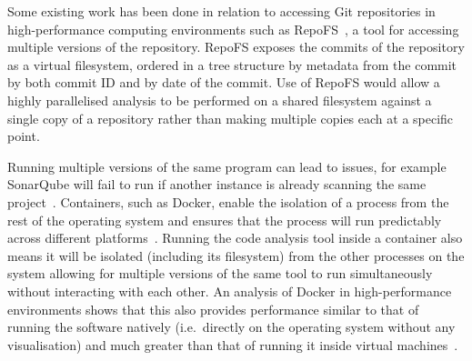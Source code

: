 Some existing work has been done in relation to accessing Git repositories in high-performance computing environments such as RepoFS~\cite{repofs}, a tool for accessing multiple versions of the repository.
RepoFS exposes the commits of the repository as a virtual filesystem, ordered in a tree structure by metadata from the commit by both commit ID and by date of the commit.
Use of RepoFS would allow a highly parallelised analysis to be performed on a shared filesystem against a single copy of a repository rather than making multiple copies each at a specific point.

Running multiple versions of the same program can lead to issues, for example SonarQube will fail to run if another instance is already scanning the same project~\cite{sonarqube_parallel}.
Containers, such as Docker, enable the isolation of a process from the rest of the operating system and ensures that the process will run predictably across different platforms~\cite{container_benefits}.
Running the code analysis tool inside a container also means it will be isolated (including its filesystem) from the other processes on the system allowing for multiple versions of the same tool to run simultaneously without interacting with each other.
An analysis of Docker in high-performance environments shows that this also provides performance similar to that of running the software natively (i.e.\ directly on the operating system without any visualisation) and much greater than that of running it inside virtual machines~\cite{docker_hpc}.
